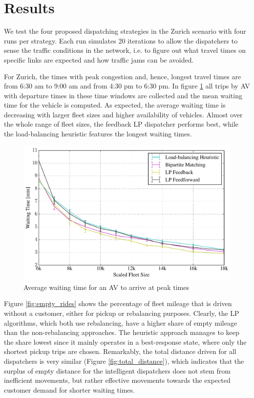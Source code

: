\section{Results}
\label{sec:results}

We test the four proposed dispatching strategies in the Zurich scenario with four runs per strategy. Each run simulates 20 iterations to allow the dispatchers to sense the traffic conditions in the network, i.e. to figure out what travel times on specific links are expected and how traffic jams can be avoided.

For Zurich, the times with peak congestion and, hence, longest travel times are from 6:30 am to 9:00 am and from 4:30 pm to 6:30 pm. In figure \ref{fig:mean_peak_waiting_times} all trips by AV with departure times in these time windows are collected
and the mean waiting time for the vehicle is computed. As expected, the average waiting time is decreasing with larger fleet sizes and higher availability of vehicles. Almost over the whole range of fleet sizes, the feedback LP dispatcher performs best, while the load-balancing heuristic features the longest waiting times.

\begin{figure}
\includegraphics[width=1.0\textwidth]{figures/mean_peak_waiting_times.pdf}
\caption{Average waiting time for an AV to arrive at peak times}
\label{fig:mean_peak_waiting_times}
\end{figure}

Figure \ref{fig:empty_rides} shows the percentage of fleet mileage that is driven without a customer, either for pickup or rebalancing purposes. Clearly, the LP algorithms, which both use rebalancing, have a higher share of empty mileage than the non-rebalancing approaches. The heuristic approach manages to keep the
share lowest since it mainly operates in a best-response state, where only the shortest pickup trips are chosen. Remarkably, the total distance driven for all dispatchers is very similar (Figure \ref{fig:total_distance}), which indicates
that the surplus of empty distance for the intelligent dispatchers does not stem from inefficient movements, but rather effective movements towards the expected customer demand for shorter waiting times.

